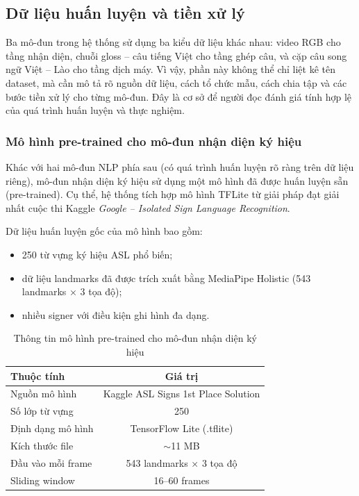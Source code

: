 ﻿\subsection{Dữ liệu huấn luyện và tiền xử lý}

Ba mô-đun trong hệ thống sử dụng ba kiểu dữ liệu khác nhau: video RGB cho tầng nhận diện,
chuỗi gloss -- câu tiếng Việt cho tầng ghép câu, và cặp câu song ngữ Việt -- Lào cho tầng
dịch máy. Vì vậy, phần này không thể chỉ liệt kê tên dataset, mà cần mô tả rõ nguồn dữ liệu,
cách tổ chức mẫu, cách chia tập và các bước tiền xử lý cho từng mô-đun. Đây là cơ sở để người
đọc đánh giá tính hợp lệ của quá trình huấn luyện và thực nghiệm.

\subsubsection{Mô hình pre-trained cho mô-đun nhận diện ký hiệu}

Khác với hai mô-đun NLP phía sau (có quá trình huấn luyện rõ ràng trên dữ liệu riêng), mô-đun nhận
diện ký hiệu sử dụng một mô hình đã được huấn luyện sẵn (pre-trained). Cụ thể, hệ thống tích hợp
mô hình TFLite từ giải pháp đạt giải nhất cuộc thi Kaggle \textit{Google -- Isolated Sign Language
Recognition}.

Dữ liệu huấn luyện gốc của mô hình bao gồm:
\begin{itemize}
    \item 250 từ vựng ký hiệu ASL phổ biến;
    \item dữ liệu landmarks đã được trích xuất bằng MediaPipe Holistic (543 landmarks × 3 tọa độ);
    \item nhiều signer với điều kiện ghi hình đa dạng.
\end{itemize}

\begin{table}[H]
\centering
\caption{Thông tin mô hình pre-trained cho mô-đun nhận diện ký hiệu}
\label{tab:asl250-model-info}
\begin{tabularx}{\textwidth}{|X|c|}
\hline
\textbf{Thuộc tính} & \textbf{Giá trị} \\
\hline
Nguồn mô hình & Kaggle ASL Signs 1st Place Solution \\
\hline
Số lớp từ vựng & 250 \\
\hline
Định dạng mô hình & TensorFlow Lite (.tflite) \\
\hline
Kích thước file & $\sim$11 MB \\
\hline
Đầu vào mỗi frame & 543 landmarks × 3 tọa độ \\
\hline
Sliding window & 16--60 frames \\
\hline
\end{tabularx}
\end{table}

